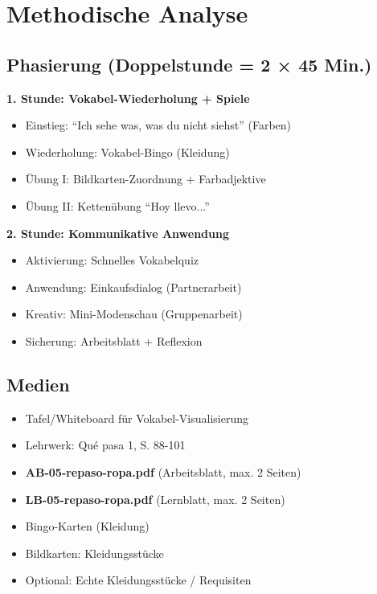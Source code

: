 \documentclass[11pt,a4paper]{article}
\begin{document}
\section{Methodische Analyse}

\subsection{Phasierung (Doppelstunde = 2 × 45 Min.)}

\textbf{1. Stunde: Vokabel-Wiederholung + Spiele}
\begin{itemize}
    \item Einstieg: ``Ich sehe was, was du nicht siehst'' (Farben)
    \item Wiederholung: Vokabel-Bingo (Kleidung)
    \item Übung I: Bildkarten-Zuordnung + Farbadjektive
    \item Übung II: Kettenübung ``Hoy llevo...''
\end{itemize}

\textbf{2. Stunde: Kommunikative Anwendung}
\begin{itemize}
    \item Aktivierung: Schnelles Vokabelquiz
    \item Anwendung: Einkaufsdialog (Partnerarbeit)
    \item Kreativ: Mini-Modenschau (Gruppenarbeit)
    \item Sicherung: Arbeitsblatt + Reflexion
\end{itemize}

\subsection{Medien}
\begin{itemize}
    \item Tafel/Whiteboard für Vokabel-Visualisierung
    \item Lehrwerk: Qué pasa 1, S. 88-101
    \item \textbf{AB-05-repaso-ropa.pdf} (Arbeitsblatt, max. 2 Seiten)
    \item \textbf{LB-05-repaso-ropa.pdf} (Lernblatt, max. 2 Seiten)
    \item Bingo-Karten (Kleidung)
    \item Bildkarten: Kleidungsstücke
    \item Optional: Echte Kleidungsstücke / Requisiten
\end{itemize}
\end{document}
